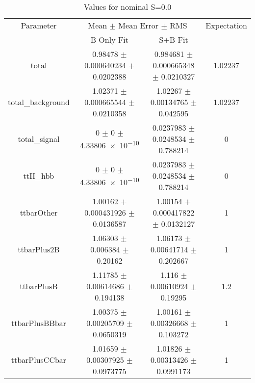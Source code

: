 \begin{table}
\centering
\caption{Values for nominal S=0.0}
\begin{tabular}{cccc}
\toprule
Parameter & \multicolumn{2}{c}{Mean $\pm$ Mean Error $\pm$ RMS} & Expectation\\
 & B-Only Fit & S+B Fit & \\
\midrule
total & \num{0.98478} $\pm$ \num{0.000640234} $\pm$ \num{0.0202388} & \num{0.984681} $\pm$ \num{0.000665348} $\pm$ \num{0.0210327} & \num{1.02237}\\
total\_background & \num{1.02371} $\pm$ \num{0.000665544} $\pm$ \num{0.0210358} & \num{1.02267} $\pm$ \num{0.00134765} $\pm$ \num{0.042595} & \num{1.02237}\\
total\_signal & \num{0} $\pm$ \num{0} $\pm$ \num{4.33806e-10} & \num{0.0237983} $\pm$ \num{0.0248534} $\pm$ \num{0.788214} & \num{0}\\
ttH\_hbb & \num{0} $\pm$ \num{0} $\pm$ \num{4.33806e-10} & \num{0.0237983} $\pm$ \num{0.0248534} $\pm$ \num{0.788214} & \num{0}\\
ttbarOther & \num{1.00162} $\pm$ \num{0.000431926} $\pm$ \num{0.0136587} & \num{1.00154} $\pm$ \num{0.000417822} $\pm$ \num{0.0132127} & \num{1}\\
ttbarPlus2B & \num{1.06303} $\pm$ \num{0.006384} $\pm$ \num{0.20162} & \num{1.06173} $\pm$ \num{0.00641714} $\pm$ \num{0.202667} & \num{1}\\
ttbarPlusB & \num{1.11785} $\pm$ \num{0.00614686} $\pm$ \num{0.194138} & \num{1.116} $\pm$ \num{0.00610924} $\pm$ \num{0.19295} & \num{1.2}\\
ttbarPlusBBbar & \num{1.00375} $\pm$ \num{0.00205709} $\pm$ \num{0.0650319} & \num{1.00161} $\pm$ \num{0.00326668} $\pm$ \num{0.103272} & \num{1}\\
ttbarPlusCCbar & \num{1.01659} $\pm$ \num{0.00307925} $\pm$ \num{0.0973775} & \num{1.01826} $\pm$ \num{0.00313426} $\pm$ \num{0.0991173} & \num{1}\\
\bottomrule
\end{tabular}
\end{table}